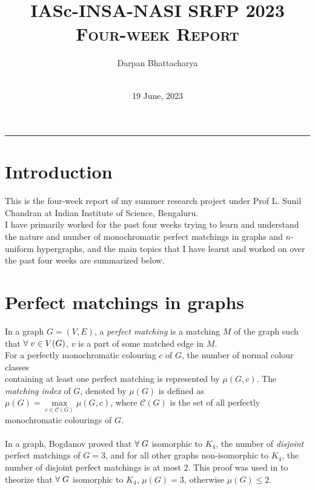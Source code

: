 \documentclass[11pt]{article}
\title{\textbf{IASc-INSA-NASI SRFP 2023}\\
       \textsc{Four-week Report}}
\author{\vspace{0.1cm}Darpan Bhattacharya \\
\fontfamily{cmss}\selectfont{\footnotesize{Application ID: ENGS302}} \\
\fontfamily{cmss}\selectfont{\footnotesize{Guide: Prof L. Sunil Chandran, IISc Bengaluru}}}
\date{19 June, 2023}
\begin{document}
\maketitle
\hrule

\section*{Introduction}
This is the four-week report of my summer research project under Prof L. Sunil Chandran at Indian Institute of Science, Bengaluru. \\
I have primarily worked for the past four weeks trying to learn and understand the nature and number of monochromatic perfect matchings in graphs and $n$-uniform hypergraphs, and the main topics that I have learnt and worked on over the past four weeks are summarized below.

\section*{Perfect matchings in graphs}
In a graph $G=(V,E)$, a \textit{perfect matching} is a matching $M$ of the graph such that $\forall \hspace{0.1cm} v \in V(G)$, $v$ is a part of some matched edge in $M$. \\
For a perfectly monochromatic colouring $c$ of $G$, the number of normal colour classes \\containing at least one perfect matching is represented by $\mu(G,c)$.
The \textit{matching index} of $G$, denoted by $\mu(G)$ is defined as \mbox{$\mu(G) = \max\limits_{c \in \mathcal{C}(G)} \mu(G,c)$}, where $\mathcal{C}(G)$ is the set of all perfectly monochromatic colourings of $G$. \\ \\
In a  graph, Bogdanov\cite{bogdanov} proved that $\forall \hspace{0.1cm} G$ isomorphic to $K_4$, the number of \textit{disjoint} \\perfect matchings of $G=3$, and for all other  graphs non-isomorphic to $K_4$, the number of disjoint perfect matchings is at most $2$. This proof was used in \cite{chandran2022perfect} to theorize that $\forall \hspace{0.1cm} G$ isomorphic to $K_4$, $\mu(G)=3$, otherwise $\mu(G) \le 2$.
\end{document}
